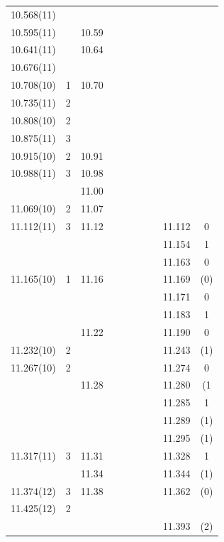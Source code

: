 {\begin{landscape}
\begin{center}
\begin{longtable}{cc cc cc cc cc}
10.568(11)	&		&		&		&		&		&		&		&		&		\\
  10.595(11)  	&		&	10.59	&		&		&		&		&		&		&		\\
     10.641(11) 	&		&	10.64	&		&		&		&		&		&		&		\\
     10.676(11) 	&		&		&		&		&		&		&		&		&		\\
     10.708(10) 	&	1	&	10.70	&		&		&		&		&		&		&		\\
     10.735(11) 	&	2	&		&		&		&		&		&		&		&		\\
     10.808(10) 	&	2	&		&		&		&		&		&		&		&		\\
     10.875(11) 	&	3	&		&		&		&		&		&		&		&		\\
     10.915(10) 	&	2	&	10.91	&		&		&		&		&		&		&		\\
   10.988(11)   	&	3	&	10.98	&		&		&		&		&		&		&		\\
	&		&	11.00	&		&		&		&		&		&		&		\\
    11.069(10)  	&	2	&	11.07	&		&		&		&		&		&		&		\\
     11.112(11) 	&	3	&	11.12	&		&		&		&		&		&	11.112	&	0	\\
	&		&		&		&		&		&		&		&	11.154	&	1	\\
	&		&		&		&		&		&		&		&	11.163	&	0	\\
    11.165(10)  	&	1	&	11.16	&		&		&		&		&		&	11.169	&	(0)	\\
	&		&		&		&		&		&		&		&	11.171	&	0	\\
	&		&		&		&		&		&		&		&	11.183	&	1	\\
	&		&	11.22	&		&		&		&		&		&	11.190	&	0	\\
    11.232(10)  	&	2	&		&		&		&		&		&		&	11.243	&	(1)	\\
    11.267(10)  	&	2	&		&		&		&		&		&		&	11.274	&	0	\\
	&		&	11.28	&		&		&		&		&		&	11.280	&	(1	\\
	&		&		&		&		&		&		&		&	11.285	&	1	\\
	&		&		&		&		&		&		&		&	11.289	&	(1)	\\
	&		&		&		&		&		&		&		&	11.295	&	(1)	\\
    11.317(11)  	&	3	&	11.31	&		&		&		&		&		&	11.328	&	1	\\
	&		&	11.34	&		&		&		&		&		&	11.344	&	(1)	\\									
    11.374(12)  	&	3	&	11.38	&		&		&		&		&		&	11.362	&	(0)	\\
    11.425(12)  	&	2	&		&		&		&		&		&		&				\\
	&		&		&		&		&		&		&		&	11.393	&	(2)	\\

\end{longtable}
\end{center}
\end{landscape}}
